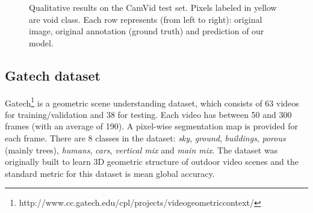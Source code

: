\documentclass[10pt,twocolumn,letterpaper]{article}
\begin{document}
\begin{figure*}[t!]
\centering
{}\hfill 
{}\hfill
{}\hfill 
{}\hfill \\
\hfill
{}\hfill 
{}\hfill \\
\hfill
{}\hfill
{}\hfill \\
\hfill
{}\hfill
{}\hfill\\
\hfill
{}\hfill
{}\hfill\\
\caption{Qualitative results on the CamVid test set. Pixels labeled in yellow are void class. Each row represents (from left to right): original image, original annotation (ground truth) and prediction of our model.}
\label{fig:predictions}
\end{figure*}

\subsection{Gatech dataset} 
Gatech\footnote{http://www.cc.gatech.edu/cpl/projects/videogeometriccontext/} \cite{VideoGeometricContext2013} is a geometric scene understanding dataset, which consists of 63 videos for training/validation and 38 for testing. Each video has between 50 and 300 frames (with an average of 190). A pixel-wise segmentation map is provided for each frame. There are 8 classes in the dataset: \textit{sky}, \textit{ground}, \textit{buildings}, \textit{porous} (mainly trees), \textit{humans}, \textit{cars}, \textit{vertical mix} and \textit{main mix}. The dataset was originally built to learn 3D geometric structure of outdoor video scenes and the standard metric for this dataset is mean global accuracy.
\end{document}
